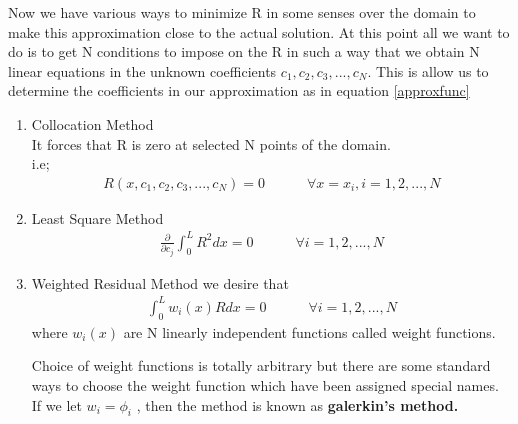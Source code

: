 Now we have various ways to minimize R in some senses over the domain to make this approximation close to the actual solution. At this point all we want to do is to get N conditions to impose on the R in such a way that we obtain N linear equations in the unknown coefficients $c_1, c_2, c_3,...,c_N$.
This is allow us to determine the coefficients in our approximation as in equation \ref{approxfunc}
\begin{enumerate}
	\item Collocation Method\\
	It forces that R is zero at selected N points of the domain.\\
	i.e; 
	\begin{eqnarray}
		R(x,c_1, c_2, c_3,...,c_N) = 0  \quad\quad\quad \forall x=x_i, i = 1,2,...,N
	\end{eqnarray}

	\item Least Square Method
		\begin{eqnarray}
			\frac{\partial}{\partial c_j} \int_{0}^{L} R^2 dx = 0 \quad\quad\quad \forall i = 1,2,...,N
		\end{eqnarray}
	
	\item Weighted Residual Method
		we desire that 
			\begin{eqnarray}\label{weightedintegralgen}
				\int_{0}^{L} w_i(x) R dx = 0 \quad\quad\quad \forall i = 1,2,...,N
			\end{eqnarray}
		where $w_i(x)$ are N linearly independent functions called weight functions.
		
		Choice of weight functions is totally arbitrary but there are some standard ways to choose the weight function which have been assigned special names. If we let $w_i = \phi_i$ , then the method is known as \textbf{galerkin's method.}
\end{enumerate}

